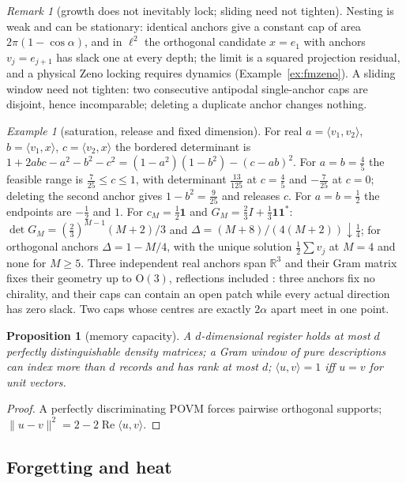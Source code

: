 \documentclass[aps,pra,onecolumn,superscriptaddress,nofootinbib,10pt]{revtex4-2}
\newtheorem{proposition}[theorem]{Proposition}
\theoremstyle{definition}
\theoremstyle{remark}
\newtheorem{remark}[theorem]{Remark}
\newtheorem{example}[theorem]{Example}
\newcommand{\R}{\mathbb{R}}
\newcommand{\re}{\operatorname{Re}}
\newcommand{\ip}[2]{\langle #1,#2\rangle}
\newcommand{\OO}{\mathrm{O}}
\begin{document}
\begin{remark}[growth does not inevitably lock; sliding need not tighten]\label{rem:fmnolock}
Nesting is weak and can be stationary: identical anchors give a constant cap of area $2\pi(1-\cos\alpha)$, and in $\ell^2$
the orthogonal candidate $x=e_1$ with anchors $v_j=e_{j+1}$ has slack one at every depth; the limit is a squared projection
residual, and a physical Zeno locking requires dynamics (Example~\ref{ex:fmzeno}).  A sliding window need not
tighten: two consecutive antipodal single-anchor caps are disjoint, hence incomparable; deleting a
duplicate anchor changes nothing.
\end{remark}

\begin{example}[saturation, release and fixed dimension]\label{ex:fmgram}
For real $a=\ip{v_1}{v_2}$, $b=\ip{v_1}x$, $c=\ip{v_2}x$ the bordered determinant is $1+2abc-a^2-b^2-c^2=(1-a^2)(1-b^2)-(c-ab)^2$.  For $a=b=\tfrac45$
the feasible range is $\tfrac7{25}\le c\le1$, with determinant $\tfrac{13}{125}$ at $c=\tfrac45$ and $-\tfrac7{25}$ at $c=0$; deleting the second anchor gives
$1-b^2=\tfrac9{25}$ and releases $c$.  For $a=b=\tfrac12$ the endpoints are $-\tfrac12$ and $1$.  For $c_M=\tfrac12\mathbf1$ and $G_M=\tfrac23I+\tfrac13\mathbf1\mathbf1^*$:
$\det G_M=(\tfrac23)^{M-1}(M+2)/3$ and $\Delta=(M+8)/(4(M+2))\downarrow\tfrac14$; for orthogonal anchors $\Delta=1-M/4$, with the unique solution $\tfrac12\sum v_j$
at $M=4$ and none for $M\ge5$.  Three independent real anchors span $\R^3$ and their Gram matrix fixes their
geometry up to $\OO(3)$, reflections included \cite[Prop.~0.25]{PaperI}: three anchors fix no chirality, and
their caps can contain an open patch while every actual direction has zero slack.  Two caps whose
centres are exactly $2\alpha$ apart meet in one point.
\end{example}

\begin{proposition}[memory capacity]\label{prop:fmcapacity}
A $d$-dimensional register holds at most $d$ perfectly distinguishable density matrices; a Gram window of
pure descriptions can index more than $d$ records and has rank at most $d$; $\ip uv=1$ iff $u=v$ for unit vectors.
\end{proposition}
\begin{proof}
A perfectly discriminating POVM forces pairwise orthogonal supports; $\lVert u-v\rVert^2=2-2\re\ip uv$.
\end{proof}

\subsection{Forgetting and heat}\label{sec:fmheat}
\end{document}
